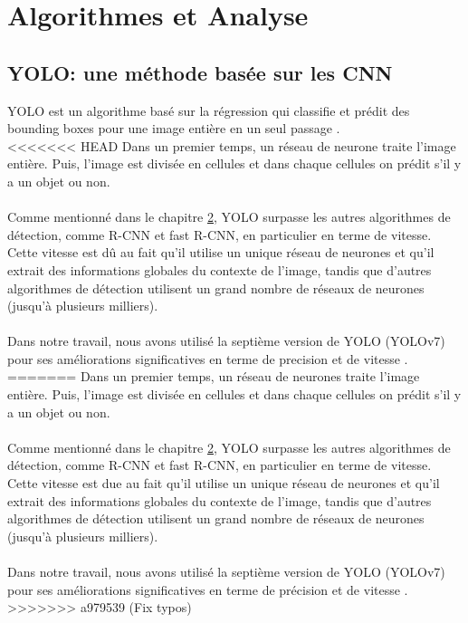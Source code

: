 \pagestyle{plain}
\chapter{Algorithmes et Analyse}


\section{YOLO: une méthode basée sur les CNN}
YOLO est un algorithme basé sur la régression qui classifie et prédit des bounding boxes pour une image entière en un seul passage \cite{redmon_you_2016}.\\
<<<<<<< HEAD
Dans un premier temps, un réseau de neurone traite l'image entière. Puis, l'image est divisée en cellules et dans chaque cellules on prédit s'il y a un objet ou non.\\
\\
Comme mentionné dans le chapitre \hyperlink{chapter.2}{2}, YOLO surpasse les autres algorithmes de détection, comme R-CNN et fast R-CNN, en particulier en terme de vitesse. Cette vitesse est dû au fait qu'il utilise un unique réseau de neurones et qu'il extrait des informations globales du contexte de l'image, tandis que d'autres algorithmes de détection utilisent un grand nombre de réseaux de neurones (jusqu'à plusieurs milliers).\\
\\
Dans notre travail, nous avons utilisé la septième version de YOLO (YOLOv7) pour ses améliorations significatives en terme de precision et de vitesse \cite{wang_yolov7_nodate}.
=======
Dans un premier temps, un réseau de neurones traite l'image entière. Puis, l'image est divisée en cellules et dans chaque cellules on prédit s'il y a un objet ou non.\\
\\
Comme mentionné dans le chapitre \hyperlink{chapter.2}{2}, YOLO surpasse les autres algorithmes de détection, comme R-CNN et fast R-CNN, en particulier en terme de vitesse. Cette vitesse est due au fait qu'il utilise un unique réseau de neurones et qu'il extrait des informations globales du contexte de l'image, tandis que d'autres algorithmes de détection utilisent un grand nombre de réseaux de neurones (jusqu'à plusieurs milliers).\\
\\
Dans notre travail, nous avons utilisé la septième version de YOLO (YOLOv7) pour ses améliorations significatives en terme de précision et de vitesse \cite{wang_yolov7_nodate}.
>>>>>>> a979539 (Fix typos)




